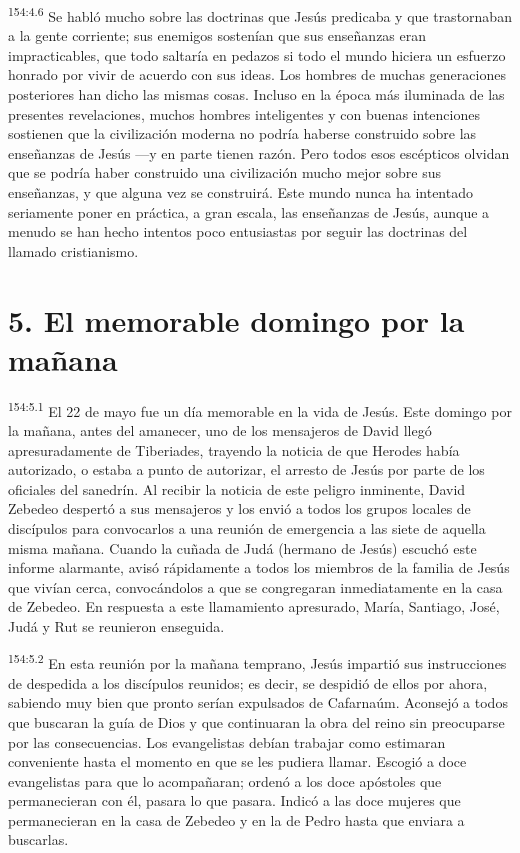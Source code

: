\par 
\textsuperscript{154:4.6} Se habló mucho sobre las doctrinas que Jesús predicaba y que trastornaban a la gente corriente; sus enemigos sostenían que sus enseñanzas eran impracticables, que todo saltaría en pedazos si todo el mundo hiciera un esfuerzo honrado por vivir de acuerdo con sus ideas. Los hombres de muchas generaciones posteriores han dicho las mismas cosas. Incluso en la época más iluminada de las presentes revelaciones, muchos hombres inteligentes y con buenas intenciones sostienen que la civilización moderna no podría haberse construido sobre las enseñanzas de Jesús ---y en parte tienen razón. Pero todos esos escépticos olvidan que se podría haber construido una civilización mucho mejor sobre sus enseñanzas, y que alguna vez se construirá. Este mundo nunca ha intentado seriamente poner en práctica, a gran escala, las enseñanzas de Jesús, aunque a menudo se han hecho intentos poco entusiastas por seguir las doctrinas del llamado cristianismo.

\section*{5. El memorable domingo por la mañana}
\par 
\textsuperscript{154:5.1} El 22 de mayo fue un día memorable en la vida de Jesús. Este domingo por la mañana, antes del amanecer, uno de los mensajeros de David llegó apresuradamente de Tiberiades, trayendo la noticia de que Herodes había autorizado, o estaba a punto de autorizar, el arresto de Jesús por parte de los oficiales del sanedrín. Al recibir la noticia de este peligro inminente, David Zebedeo despertó a sus mensajeros y los envió a todos los grupos locales de discípulos para convocarlos a una reunión de emergencia a las siete de aquella misma mañana. Cuando la cuñada de Judá (hermano de Jesús) escuchó este informe alarmante, avisó rápidamente a todos los miembros de la familia de Jesús que vivían cerca, convocándolos a que se congregaran inmediatamente en la casa de Zebedeo. En respuesta a este llamamiento apresurado, María, Santiago, José, Judá y Rut se reunieron enseguida.

\par 
\textsuperscript{154:5.2} En esta reunión por la mañana temprano, Jesús impartió sus instrucciones de despedida a los discípulos reunidos; es decir, se despidió de ellos por ahora, sabiendo muy bien que pronto serían expulsados de Cafarnaúm. Aconsejó a todos que buscaran la guía de Dios y que continuaran la obra del reino sin preocuparse por las consecuencias. Los evangelistas debían trabajar como estimaran conveniente hasta el momento en que se les pudiera llamar. Escogió a doce evangelistas para que lo acompañaran; ordenó a los doce apóstoles que permanecieran con él, pasara lo que pasara. Indicó a las doce mujeres que permanecieran en la casa de Zebedeo y en la de Pedro hasta que enviara a buscarlas.


